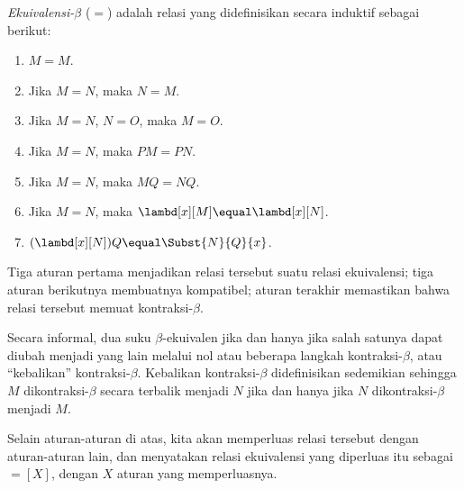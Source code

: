 \documentclass[../../../include/open-logic-section]{subfiles}
\begin{document}
\begin{defn}
  \emph{Ekuivalensi-$\beta$} ($\equal$) adalah relasi yang didefinisikan
  secara induktif sebagai berikut:
  \begin{enumerate}
  \item $M \equal M$.
  \item Jika $M \equal N$, maka $N \equal M$.
  \item Jika $M \equal N$, $N \equal O$, maka $M \equal O$.
  \item Jika $M \equal N$, maka $PM \equal PN$.
  \item Jika $M \equal N$, maka $MQ \equal NQ$.
  \item Jika $M \equal N$, maka $\lambd[x][M] \equal \lambd[x][N]$.
  \item $(\lambd[x][N])Q \equal \Subst{N}{Q}{x}$.
  \end{enumerate}
\end{defn}

Tiga aturan pertama menjadikan relasi tersebut suatu relasi ekuivalensi; tiga
aturan berikutnya membuatnya kompatibel; aturan terakhir memastikan bahwa
relasi tersebut memuat kontraksi-$\beta$.

Secara informal, dua suku $\beta$-ekuivalen jika dan hanya jika salah satunya
dapat diubah menjadi yang lain melalui nol atau beberapa langkah
kontraksi-$\beta$, atau ``kebalikan'' kontraksi-$\beta$. Kebalikan
kontraksi-$\beta$ didefinisikan sedemikian sehingga $M$ dikontraksi-$\beta$
secara terbalik menjadi $N$ jika dan hanya jika $N$ dikontraksi-$\beta$
menjadi $M$.

Selain aturan-aturan di atas, kita akan memperluas relasi tersebut dengan
aturan-aturan lain, dan menyatakan relasi ekuivalensi yang diperluas itu
sebagai $\equal[X]$, dengan $X$ aturan yang memperluasnya.
\end{document}
